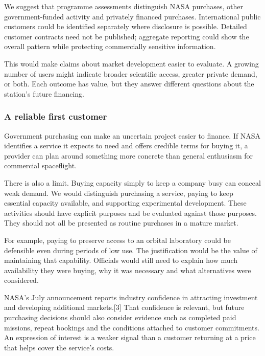 \documentclass[11pt,letterpaper]{article}
\begin{document}
We suggest that programme assessments distinguish NASA purchases, other
government-funded activity and privately financed purchases.
International public customers could be identified separately where
disclosure is possible. Detailed customer contracts need not be
published; aggregate reporting could show the overall pattern while
protecting commercially sensitive information.

This would make claims about market development easier to evaluate. A
growing number of users might indicate broader scientific access,
greater private demand, or both. Each outcome has value, but they answer
different questions about the station's future financing.

\hypertarget{a-reliable-first-customer}{%
\subsubsection{A reliable first
customer}\label{a-reliable-first-customer}}

Government purchasing can make an uncertain project easier to finance.
If NASA identifies a service it expects to need and offers credible
terms for buying it, a provider can plan around something more concrete
than general enthusiasm for commercial spaceflight.

There is also a limit. Buying capacity simply to keep a company busy can
conceal weak demand. We would distinguish purchasing a service, paying
to keep essential capacity available, and supporting experimental
development. These activities should have explicit purposes and be
evaluated against those purposes. They should not all be presented as
routine purchases in a mature market.

For example, paying to preserve access to an orbital laboratory could be
defensible even during periods of low use. The justification would be
the value of maintaining that capability. Officials would still need to
explain how much availability they were buying, why it was necessary and
what alternatives were considered.

NASA's July announcement reports industry confidence in attracting
investment and developing additional markets.{[}3{]} That confidence is
relevant, but future purchasing decisions should also consider evidence
such as completed paid missions, repeat bookings and the conditions
attached to customer commitments. An expression of interest is a weaker
signal than a customer returning at a price that helps cover the
service's costs.
\end{document}
